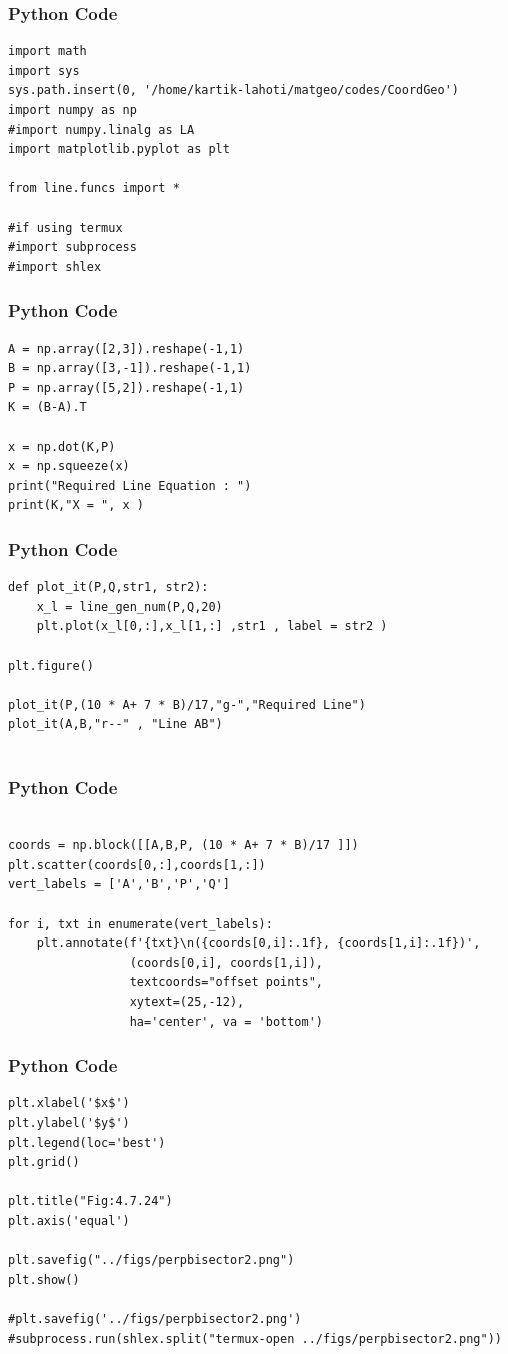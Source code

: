 \documentclass{beamer}
\begin{document}
\begin{frame}[fragile]
    \frametitle{Python Code}
    \begin{lstlisting}
import math
import sys
sys.path.insert(0, '/home/kartik-lahoti/matgeo/codes/CoordGeo')
import numpy as np
#import numpy.linalg as LA
import matplotlib.pyplot as plt

from line.funcs import *

#if using termux
#import subprocess
#import shlex
\end{lstlisting}
\end{frame}

\begin{frame}[fragile]
    \frametitle{Python Code }
    \begin{lstlisting}
A = np.array([2,3]).reshape(-1,1)
B = np.array([3,-1]).reshape(-1,1)
P = np.array([5,2]).reshape(-1,1)
K = (B-A).T

x = np.dot(K,P)
x = np.squeeze(x)
print("Required Line Equation : ")
print(K,"X = ", x )
\end{lstlisting}
\end{frame}

\begin{frame}[fragile]
    \frametitle{Python Code }
    \begin{lstlisting}
def plot_it(P,Q,str1, str2):
    x_l = line_gen_num(P,Q,20)
    plt.plot(x_l[0,:],x_l[1,:] ,str1 , label = str2 )

plt.figure()

plot_it(P,(10 * A+ 7 * B)/17,"g-","Required Line")
plot_it(A,B,"r--" , "Line AB")


\end{lstlisting}
\end{frame}

\begin{frame}[fragile]
    \frametitle{Python Code }
    \begin{lstlisting}

coords = np.block([[A,B,P, (10 * A+ 7 * B)/17 ]])
plt.scatter(coords[0,:],coords[1,:])
vert_labels = ['A','B','P','Q']

for i, txt in enumerate(vert_labels):
    plt.annotate(f'{txt}\n({coords[0,i]:.1f}, {coords[1,i]:.1f})',
                 (coords[0,i], coords[1,i]),
                 textcoords="offset points",
                 xytext=(25,-12),
                 ha='center', va = 'bottom')
    \end{lstlisting}
\end{frame}
\begin{frame}[fragile]
    \frametitle{Python Code }
    \begin{lstlisting}
plt.xlabel('$x$')
plt.ylabel('$y$')
plt.legend(loc='best')
plt.grid()

plt.title("Fig:4.7.24")
plt.axis('equal')

plt.savefig("../figs/perpbisector2.png")
plt.show()

#plt.savefig('../figs/perpbisector2.png')
#subprocess.run(shlex.split("termux-open ../figs/perpbisector2.png"))
    \end{lstlisting}
\end{frame}
\end{document}
